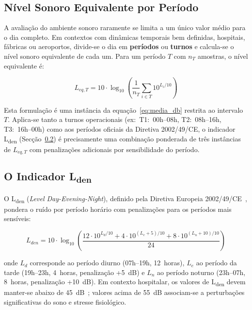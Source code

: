 \documentclass[12pt,a4paper]{report}
\begin{document}
\subsection{Nível Sonoro Equivalente por Período}
\label{sec:leq_periodo}

A avaliação do ambiente sonoro raramente se limita a um único valor médio para o dia completo. Em contextos com dinâmicas temporais bem definidas,  hospitais, fábricas ou aeroportos,  divide-se o dia em \textbf{períodos} ou \textbf{turnos} e calcula-se o nível sonoro equivalente de cada um. Para um período $T$ com $n_T$ amostras, o nível equivalente é:

\begin{equation}
L_{eq,T} = 10 \cdot \log_{10}\!\left(\frac{1}{n_T}\sum_{i \in T} 10^{L_i/10}\right)
\label{eq:leq_periodo}
\end{equation}

Esta formulação é uma instância da equação~\eqref{eq:media_db} restrita ao intervalo $T$. Aplica-se tanto a turnos operacionais (ex:~T1:~00h--08h, T2:~08h--16h, T3:~16h--00h) como aos períodos oficiais da Diretiva 2002/49/CE,  o indicador L\textsubscript{den} (Secção~\ref{sec:lden}) é precisamente uma combinação ponderada de três instâncias de $L_{eq,T}$ com penalizações adicionais por sensibilidade do período.

\subsection{O Indicador L\textsubscript{den}}
\label{sec:lden}

O L\textsubscript{den} (\textit{Level Day-Evening-Night}), definido pela Diretiva Europeia 2002/49/CE~\cite{lden}, pondera o ruído por período horário com penalizações para os períodos mais sensíveis:

\begin{equation}
L_{den} = 10 \cdot \log_{10}\!\left(\frac{12 \cdot 10^{L_d/10} + 4 \cdot 10^{(L_e+5)/10} + 8 \cdot 10^{(L_n+10)/10}}{24}\right)
\label{eq:lden}
\end{equation}

onde $L_d$ corresponde ao período diurno (07h--19h, 12~horas), $L_e$ ao período da tarde (19h--23h, 4~horas, penalização +5~dB) e $L_n$ ao período noturno (23h--07h, 8~horas, penalização +10~dB). Em contexto hospitalar, os valores de L\textsubscript{den} devem manter-se abaixo de 45~dB~\cite{oms2018}; valores acima de 55~dB associam-se a perturbações significativas do sono e stresse fisiológico.
\end{document}
